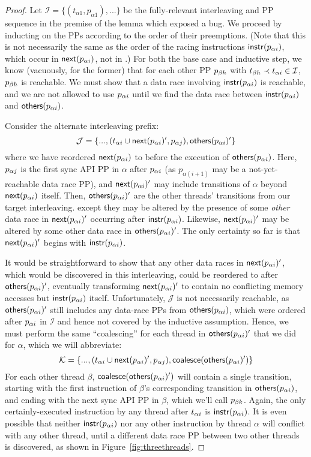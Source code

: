 \begin{proof}
Let $\mathcal{I} = \{(t_{\alpha{}1}, p_{\alpha{}1}), ...\}$ be the fully-relevant interleaving and PP sequence in the premise of the lemma which exposed a bug.
We proceed by inducting on the PPs according to the order of their preemptions.
(Note that this is not necessarily the same as the order of the racing instructions $\mathsf{instr}(p_{\alpha{}i})$, which occur in $\mathsf{next}(p_{\alpha{}i})$, not in \tai.)
For both the base case and inductive step, we know (vacuously, for the former) that for each other PP $p_{\beta{}h}$ with $t_{\beta{}h} \prec t_{\alpha{}i} \in \mathcal{I}$, $p_{\beta{}h}$ is reachable.
We must show that a data race involving $\mathsf{instr}(p_{\alpha{}i})$
is reachable, and we are not allowed to use $p_{\alpha{}i}$ until we find the data race between $\mathsf{instr}(p_{\alpha{}i})$ and $\mathsf{others}(p_{\alpha{}i})$.

Consider the alternate interleaving prefix:
\[
	\mathcal{J} = \{..., (t_{\alpha{}i} \cup \mathsf{next}(p_{\alpha{}i})', p_{\alpha{}j}), \mathsf{others}(p_{\alpha{}i})' \}
\]
where we have reordered $\mathsf{next}(p_{\alpha{}i})$ to before the execution of $\mathsf{others}(p_{\alpha{}i})$.
Here, $p_{\alpha{}j}$ is the first sync API PP in $\alpha$ after $p_{\alpha{}i}$ (as $p_{\alpha(i+1)}$ may be a not-yet-reachable data race PP),
and $\mathsf{next}(p_{\alpha{}i})'$ may include transitions of $\alpha$ beyond $\mathsf{next}(p_{\alpha{}i})$ itself.
Then, $\mathsf{others}(p_{\alpha{}i})'$ are the other threads' transitions from our target interleaving.
except they may be altered by the presence of some {\em other} data race in $\mathsf{next}(p_{\alpha{}i})'$ occurring after $\mathsf{instr}(p_{\alpha{}i})$.
Likewise, $\mathsf{next}(p_{\alpha{}i})'$ may be altered by some other data race in $\mathsf{others}(p_{\alpha{}i})'$.
The only certainty so far is that $\mathsf{next}(p_{\alpha{}i})'$ begins with $\mathsf{instr}(p_{\alpha{}i})$.

It would be straightforward to show that any other data races in $\mathsf{next}(p_{\alpha{}i})'$, which would be discovered in this interleaving,
could be reordered to after $\mathsf{others}(p_{\alpha{}i})'$,
eventually transforming $\mathsf{next}(p_{\alpha{}i})'$ to contain no conflicting memory accesses but $\mathsf{instr}(p_{\alpha{}i})$ itself.
Unfortunately, $\mathcal{J}$ is not necessarily reachable, as $\mathsf{others}(p_{\alpha{}i})'$ still includes any data-race PPs from $\mathsf{others}(p_{\alpha{}i})$,
which were ordered after $p_{\alpha{}i}$ in $\mathcal{I}$ and hence not covered by the inductive assumption.
Hence, we must perform the same ``coalescing'' for each thread in $\mathsf{others}(p_{\alpha{}i})'$ that we did for $\alpha$,
which we will abbreviate:
\[
	\mathcal{K} = \{..., (t_{\alpha{}i} \cup \mathsf{next}(p_{\alpha{}i})', p_{\alpha{}j}), \mathsf{coalesce}(\mathsf{others}(p_{\alpha{}i})') \}
\]
For each other thread $\beta$, $\mathsf{coalesce}(\mathsf{others}(p_{\alpha{}i})')$ will contain a single transition,
starting with the first instruction of $\beta$'s corresponding transition in $\mathsf{others}(p_{\alpha{}i})$,
and ending with the next sync API PP in $\beta$, which we'll call $p_{\beta{}k}$.
Again, the only certainly-executed instruction by any thread after $t_{\alpha{}i}$ is $\mathsf{instr}(p_{\alpha{}i})$.
It is even possible that neither $\mathsf{instr}(p_{\alpha{}i})$ nor any other instruction by thread $\alpha$ will conflict with any other thread,
until a different data race PP between two other threads is discovered,
as shown in Figure~\ref{fig:threethreads}.


\end{proof}

